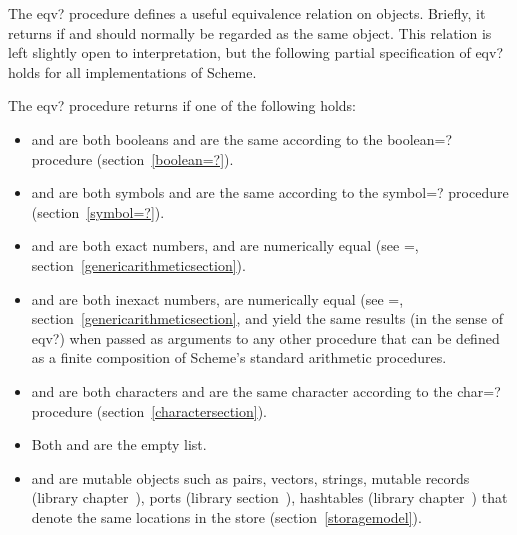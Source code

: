 \begin{entry}{%
}

The {\cf eqv?} procedure defines a useful equivalence relation on objects.
Briefly, it returns \schtrue{} if  and  should
normally be regarded as the same object.  This relation is left slightly
open to interpretation, but the following partial specification of
{\cf eqv?} holds for all implementations of Scheme.

The {\cf eqv?} procedure returns \schtrue{} if one of the following holds:

\begin{itemize}
\item {} and  are both booleans and are the same
  according to the {\cf boolean=?} procedure (section~\ref{boolean=?}).

\item {} and  are both symbols and are the same
  according to the {\cf symbol=?} procedure (section~\ref{symbol=?}).

\item {} and  are both exact numbers,
  and are numerically equal (see {\cf =}, 
  section~\ref{genericarithmeticsection}).

\item {} and  are both inexact numbers, are numerically
  equal (see {\cf =}, section~\ref{genericarithmeticsection}, and
  yield the same results (in the sense of {\cf eqv?}) when passed
  as arguments to any other procedure that can be defined
  as a finite composition of Scheme's standard arithmetic
  procedures.

\item {} and  are both characters and are the same
character according to the {\cf char=?} procedure
(section~\ref{charactersection}).

\item Both  and  are the empty list.

\item {} and  are mutable objects such as pairs,
  vectors, strings, mutable records (library
  chapter~), ports (library
  section~), hashtables (library
  chapter~) that denote the
  same locations in the store (section~\ref{storagemodel}).


\end{itemize}
\end{entry}
